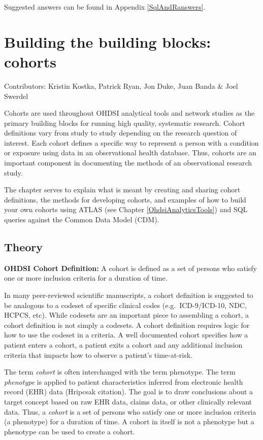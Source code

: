 \documentclass[11pt]{book}
\theoremstyle{definition}
\theoremstyle{definition}
\theoremstyle{definition}
\theoremstyle{remark}
\let\BeginKnitrBlock\begin \let\EndKnitrBlock\end
\begin{document}
Suggested answers can be found in Appendix \ref{SqlAndRanswers}.

\hypertarget{Cohorts}{%
\chapter{Building the building blocks: cohorts}\label{Cohorts}}

Contributors: Kristin Kostka, Patrick Ryan, Jon Duke, Juan Banda \& Joel Swerdel

Cohorts are used throughout OHDSI analytical tools and network studies as the primary building blocks for running high quality, systematic research. Cohort definitions vary from study to study depending on the research question of interest. Each cohort defines a specific way to represent a person with a condition or exposure using data in an observational health database. Thus, cohorts are an important component in documenting the methods of an observational research study.

The chapter serves to explain what is meant by creating and sharing cohort definitions, the methods for developing cohorts, and examples of how to build your own cohorts using ATLAS (see Chapter \ref{OhdsiAnalyticsTools}) and SQL queries against the Common Data Model (CDM).

\hypertarget{theory}{%
\section{Theory}\label{theory}}

\BeginKnitrBlock{rmdimportant}
\textbf{OHDSI Cohort Definition:} A cohort is defined as a set of persons who satisfy one or more inclusion criteria for a duration of time.
\EndKnitrBlock{rmdimportant}

In many peer-reviewed scientific manuscripts, a cohort definition is suggested to be analogous to a codeset of specific clinical codes (e.g.~ICD-9/ICD-10, NDC, HCPCS, etc). While codesets are an important piece to assembling a cohort, a cohort definition is not simply a codesets. A cohort definition requires logic for how to use the codeset in a criteria. A well documented cohort specifies how a patient enters a cohort, a patient exits a cohort and any additional inclusion criteria that impacts how to observe a patient's time-at-risk.

\BeginKnitrBlock{rmdimportant}
The term \emph{cohort} is often interchanged with the term phenotype. The term \emph{phenotype} is applied to patient characteristics inferred from electronic health record (EHR) data (Hripcsak citation). The goal is to draw conclusions about a target concept based on raw EHR data, claims data, or other clinically relevant data. Thus, a \emph{cohort} is a set of persons who satisfy one or more inclusion criteria (a phenotype) for a duration of time. A cohort in itself is not a phenotype but a phenotype can be used to create a cohort.
\EndKnitrBlock{rmdimportant}
\end{document}
